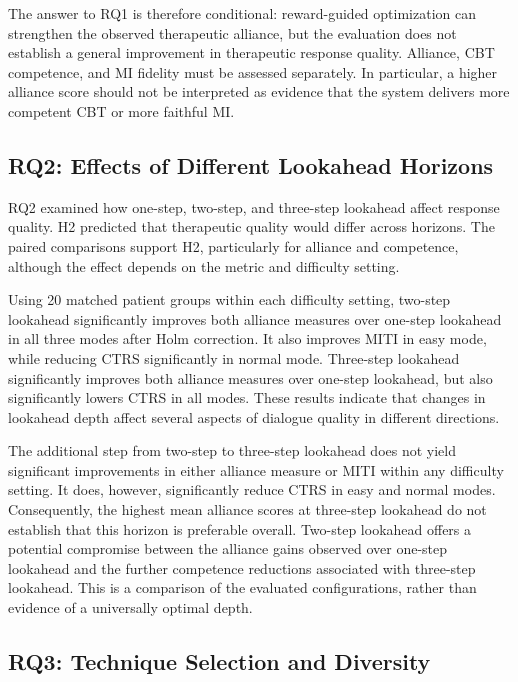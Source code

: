 The answer to RQ1 is therefore conditional: reward-guided optimization can strengthen the observed therapeutic alliance, but the evaluation does not establish a general improvement in therapeutic response quality. Alliance, CBT competence, and MI fidelity must be assessed separately. In particular, a higher alliance score should not be interpreted as evidence that the system delivers more competent CBT or more faithful MI.

\subsection{RQ2: Effects of Different Lookahead Horizons}

RQ2 examined how one-step, two-step, and three-step lookahead affect response quality. H2 predicted that therapeutic quality would differ across horizons. The paired comparisons support H2, particularly for alliance and competence, although the effect depends on the metric and difficulty setting.

Using 20 matched patient groups within each difficulty setting, two-step lookahead significantly improves both alliance measures over one-step lookahead in all three modes after Holm correction. It also improves MITI in easy mode, while reducing CTRS significantly in normal mode. Three-step lookahead significantly improves both alliance measures over one-step lookahead, but also significantly lowers CTRS in all modes. These results indicate that changes in lookahead depth affect several aspects of dialogue quality in different directions.

The additional step from two-step to three-step lookahead does not yield significant improvements in either alliance measure or MITI within any difficulty setting. It does, however, significantly reduce CTRS in easy and normal modes. Consequently, the highest mean alliance scores at three-step lookahead do not establish that this horizon is preferable overall. Two-step lookahead offers a potential compromise between the alliance gains observed over one-step lookahead and the further competence reductions associated with three-step lookahead. This is a comparison of the evaluated configurations, rather than evidence of a universally optimal depth.

\subsection{RQ3: Technique Selection and Diversity}

